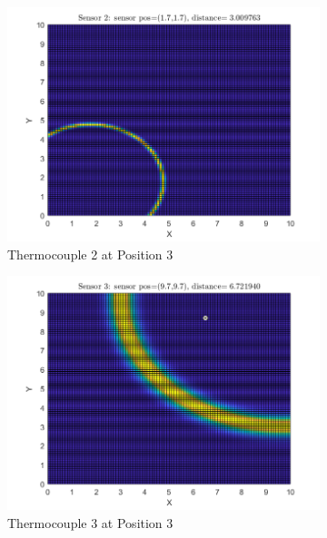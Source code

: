 \documentclass[12pt]{article}
\begin{document}
\begin{figure}[H]
\begin{subfigure}[h]{0.4\textwidth}
        \includegraphics[width=\textwidth]{images/P3S2.png}
        \caption{Thermocouple 2 at Position 3}
        \label{fig:P3S2}
    \end{subfigure}
    \baselineskip
    \begin{subfigure}[h]{0.4\textwidth}
        \includegraphics[width=\textwidth]{images/P3S3.png}
        \caption{Thermocouple 3 at Position 3}
        \label{fig:P3S3}
    \end{subfigure}
    \begin{subfigure}[h]{0.4\textwidth}

\end{subfigure}
\end{figure}
\end{document}
